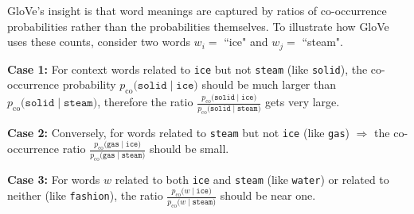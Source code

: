 GloVe's insight is that word meanings are captured by ratios of co-occurrence probabilities rather than the probabilities themselves. To illustrate how GloVe uses these counts, consider two words $w_i =$ ``ice" and $w_j = $ ``steam". 

\begin{itemizeSpaced}{0pt}
    \item \textbf{Case 1:} For context words related to \texttt{ice} but not \texttt{steam} (like \texttt{solid}), the co-occurrence probability $p_{\text{co}} \Big( \texttt{solid} \; | \; \texttt{ice} \Big)$ should be much larger than $p_{\text{co}} \Big( \texttt{solid} \; | \; \texttt{steam} \Big)$, therefore the ratio $\frac {p_{\text{co}} \Big( \texttt{solid} \; | \; \texttt{ice} \Big)} {p_{\text{co}} \Big( \texttt{solid} \; | \; \texttt{steam} \Big)}$ gets very large.

    \item \textbf{Case 2: } Conversely, for words related to \texttt{steam} but not \texttt{ice} (like \texttt{gas}) $\Rightarrow$ the co-occurrence ratio $\frac {p_{\text{co}} \Big( \texttt{gas} \; | \; \texttt{ice} \Big)} {p_{\text{co}} \Big( \texttt{gas} \; | \; \texttt{steam} \Big)}$ should be small. 

    \item \textbf{Case 3:} For words $w$ related to both \texttt{ice} and \texttt{steam} (like \texttt{water}) or related to neither (like \texttt{fashion}), the ratio $\frac {p_{\text{co}} \Big( w \; | \; \texttt{ice} \Big)} {p_{\text{co}} \Big( w \; | \; \texttt{steam} \Big)}$ should be near one. 
\end{itemizeSpaced}


% 
% 
% 
